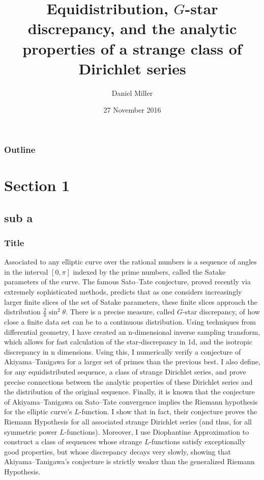 \documentclass{beamer}
\title{Equidistribution, $G$-star discrepancy, and the analytic properties of a strange class of Dirichlet series}
\author{Daniel Miller}
\institute{Cornell University}
\date{27 November 2016}
\begin{document}
\begin{frame}
\titlepage
\end{frame}

\begin{frame}
\frametitle{Outline}
\tableofcontents
\end{frame}

\section{Section 1}
\subsection{sub a}

\begin{frame}
\frametitle{Title}
Associated to any elliptic curve over the rational numbers is a sequence of angles in the interval $[0,\pi]$ indexed by the prime numbers, called the Satake parameters of the curve. The famous Sato--Tate conjecture, proved recently via extremely sophisticated methods, predicts that as one considers increasingly larger finite slices of the set of Satake parameters, these finite slices approach the distribution $\frac{2}{\pi}\sin^2 \theta$. There is a precise measure, called $G$-star discrepancy, of how close a finite data set can be to a continuous distribution. Using techniques from differential geometry, I have created an n-dimensional inverse sampling transform, which allows for fast calculation of the star-discrepancy in 1d, and the isotropic discrepancy in n dimensions. Using this, I numerically verify a conjecture of Akiyama--Tanigawa for a larger set of primes than the previous best. I also define, for any equidistributed sequence, a class of strange Dirichlet series, and prove precise connections between the analytic properties of these Dirichlet series and the distribution of the original sequence. Finally, it is known that the conjecture of Akiyama–Tanigawa on Sato–Tate convergence implies the Riemann hypothesis for the elliptic curve's $L$-function. I show that in fact, their conjecture proves the Riemann Hypothesis for all associated strange Dirichlet series (and thus, for all symmetric power $L$-functions). Moreover, I use Diophantine Approximation to construct a class of sequences whose strange $L$-functions satisfy exceptionally good properties, but whose discrepancy decays very slowly, showing that Akiyama--Tanigawa's conjecture is strictly weaker than the generalized Riemann Hypothesis. 
\end{frame}
\end{document}
